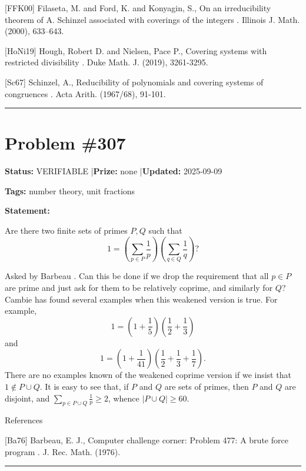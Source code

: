 \documentclass{article}
\begin{document}
[FFK00] Filaseta, M. and Ford, K. and Konyagin, S., On an irreducibility theorem of {A}. Schinzel associated with coverings of the integers . Illinois J. Math. (2000), 633--643.

[HoNi19] Hough, Robert D. and Nielsen, Pace P., Covering systems with restricted divisibility . Duke Math. J. (2019), 3261-3295.

[Sc67] Schinzel, A., Reducibility of polynomials and covering systems of congruences . Acta Arith. (1967/68), 91-101.

\noindent\rule{\linewidth}{0.4pt}


\section{Problem \#307}
\label{prob:307}

\noindent\textbf{Status:} VERIFIABLE \quad|\quad \textbf{Prize:} none \quad|\quad \textbf{Updated:} 2025-09-09

\noindent\textbf{Tags:} number theory, unit fractions

\medskip

\noindent\textbf{Statement:}

Are there two finite sets of primes $P,Q$ such that\[1=\left(\sum_{p\in P}\frac{1}{p}\right)\left(\sum_{q\in Q}\frac{1}{q}\right)?\]




Asked by Barbeau \cite{Ba76}. Can this be done if we drop the requirement that all $p\in P$ are prime and just ask for them to be relatively coprime, and similarly for $Q$? Cambie has found several examples when this weakened version is true. For example,\[1=\left(1+\frac{1}{5}\right)\left(\frac{1}{2}+\frac{1}{3}\right)\]and\[1=\left(1+\frac{1}{41}\right)\left(\frac{1}{2}+\frac{1}{3}+\frac{1}{7}\right).\]There are no examples known of the weakened coprime version if we insist that $1\not\in P\cup Q$. It is easy to see that, if $P$ and $Q$ are sets of primes, then $P$ and $Q$ are disjoint, and $\sum_{p\in P\cup Q}\frac{1}{p}\geq 2$, whence $\lvert P\cup Q\rvert \geq 60$.




References

[Ba76] Barbeau, E. J., Computer challenge corner: Problem 477: A brute force program . J. Rec. Math. (1976).

\noindent\rule{\linewidth}{0.4pt}


\end{document}
